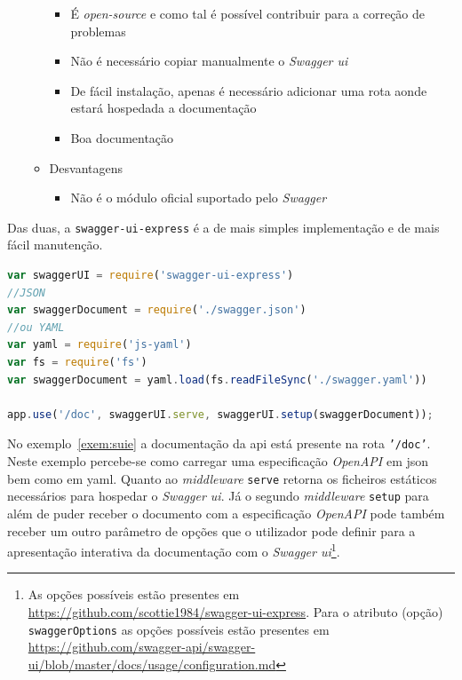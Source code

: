\begin{itemize}
\begin{itemize}
        \begin{itemize}
            \item É \textit{open-source} e como tal é possível contribuir para a correção de problemas
            \item Não é necessário copiar manualmente o \textit{Swagger \acrshort{ui}}
            \item De fácil instalação, apenas é necessário adicionar uma rota aonde estará hospedada a documentação
            \item Boa documentação
        \end{itemize}
        \item Desvantagens
        \begin{itemize}
            \item Não é o módulo oficial suportado pelo \textit{Swagger}
        \end{itemize}
    \end{itemize}
\end{itemize}

Das duas, a \texttt{swagger-ui-express} é a de mais simples implementação e de mais fácil manutenção.

\begin{lstlisting}[language=javascript, caption=Exemplo de uso do \texttt{swagger-ui-express}, label=exem:suie]
var swaggerUI = require('swagger-ui-express')
//JSON
var swaggerDocument = require('./swagger.json')
//ou YAML
var yaml = require('js-yaml')
var fs = require('fs')
var swaggerDocument = yaml.load(fs.readFileSync('./swagger.yaml'))

app.use('/doc', swaggerUI.serve, swaggerUI.setup(swaggerDocument));
\end{lstlisting}

No exemplo~\ref{exem:suie} a documentação da \acrshort{api} está presente na rota \texttt{'/doc'}. Neste exemplo percebe-se como carregar uma especificação \textit{OpenAPI} em \acrshort{json} bem como em \acrshort{yaml}. Quanto ao \textit{middleware} \texttt{serve} retorna os ficheiros estáticos necessários para hospedar o \textit{Swagger \acrshort{ui}}. Já o segundo \textit{middleware} \texttt{setup} para além de puder receber o documento com a especificação \textit{OpenAPI} pode também receber um outro parâmetro de opções que o utilizador pode definir para a apresentação interativa da documentação com o \textit{Swagger \acrshort{ui}}\footnote{As opções possíveis estão presentes em \url{https://github.com/scottie1984/swagger-ui-express}. Para o atributo (opção) \texttt{swaggerOptions} as opções possíveis estão presentes em \url{https://github.com/swagger-api/swagger-ui/blob/master/docs/usage/configuration.md}}.

